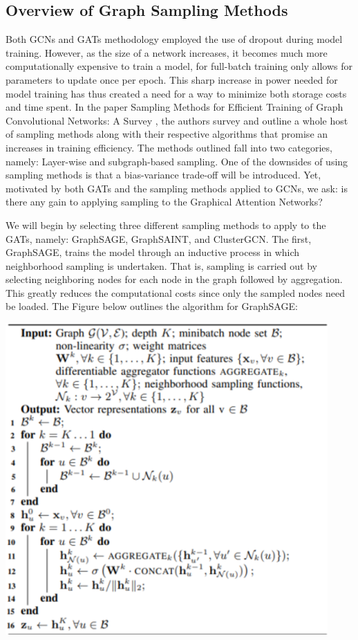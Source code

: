 \documentclass{article}
\begin{document}
	\subsection{Overview of Graph Sampling Methods} 
	
	Both GCNs and GATs methodology employed the use of dropout during model training. However, as the size of a network increases,
	it becomes much more computationally expensive to train a model, for full-batch training only allows for parameters to update once per epoch. This sharp increase in power needed for model training has thus created a need for a way to minimize both storage costs and time spent.
	In the paper Sampling Methods for Efficient Training of Graph Convolutional Networks: A Survey \cite{liu2021sampling}, the authors survey and outline a whole host 
	of sampling methods along with their respective algorithms that promise an increases in training efficiency. The methods outlined fall into two categories, namely: Layer-wise and subgraph-based sampling. One of the downsides of using sampling methods
	is that a bias-variance trade-off will be introduced. Yet, motivated by both GATs and the sampling methods applied to GCNs, we ask: is there any gain to applying sampling to the Graphical Attention Networks?
	
	We will begin by selecting three different sampling methods to apply to the GATs, namely: GraphSAGE, GraphSAINT, and ClusterGCN. The first, GraphSAGE, trains the model through an inductive process in which neighborhood sampling is undertaken. That is, sampling is carried out by 
	selecting neighboring nodes for each node in the graph followed by aggregation. This greatly reduces the computational costs since only the sampled nodes need be loaded. The Figure below outlines the algorithm for GraphSAGE:
	\begin{center}
		\includegraphics[scale=0.4]{Figures/sage.png} 
	\end{center}
	
\end{document}
